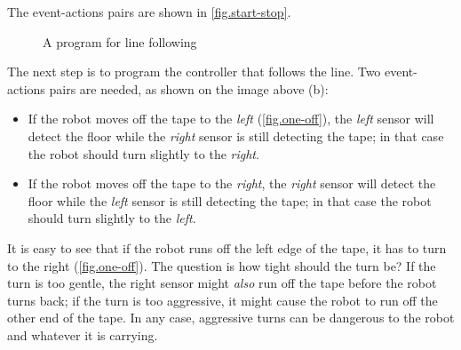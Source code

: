 The event-actions pairs are shown in \cref{fig.start-stop}.
                  
\begin{figure}
\hfill
{}
\caption{A program for line following}
\end{figure}




The next step is to program the controller that follows the line. Two
event-actions pairs are needed, as shown on the image above (b):

\begin{itemize}

\item If the robot moves off the tape to the \emph{left}
(\cref{fig.one-off}), the \emph{left} sensor will detect the floor while
the \emph{right} sensor is still detecting the tape; in that case the
robot should turn slightly to the \emph{right}.

\item If the robot moves off the tape to the \emph{right}, the
\emph{right} sensor will detect the floor while the \emph{left} sensor
is still detecting the tape; in that case the robot should turn slightly
to the \emph{left}.

\end{itemize}



It is easy to see that if the robot runs off the left edge of the tape,
it has to turn to the right (\cref{fig.one-off}). The question is
how tight should the turn be? If the turn is too gentle, the right
sensor might \emph{also} run off the tape before the robot turns back;
if the turn is too aggressive, it might cause the robot to run off the
other end of the tape. In any case, aggressive turns can be dangerous to
the robot and whatever it is carrying.

